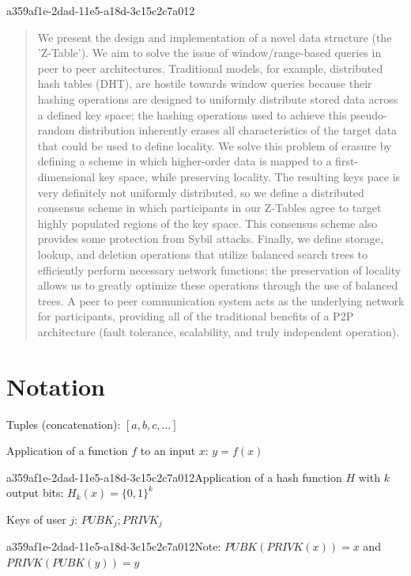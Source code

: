 \documentclass[12pt]{article}
\begin{document}
\maketitle

a359af1e-2dad-11e5-a18d-3c15c2c7a012\begin{abstract}
We present the design and implementation of a novel data structure (the 'Z-Table'). We aim to solve the issue of window/range-based queries in peer to peer architectures. Traditional models, for example,  distributed hash tables (DHT), are hostile towards window queries because their hashing operations are designed to uniformly distribute stored data across a defined key space; the hashing operations used to achieve this pseudo-random distribution inherently erases all characteristics of the target data that could be used to define locality. We solve this problem of erasure by defining a scheme in which higher-order data is mapped to a first-dimensional key space, while preserving locality. The resulting keys pace is very definitely not uniformly distributed, so we define a distributed consensus scheme in which participants in our Z-Tables agree to target highly populated regions of the key space. This consensus scheme also provides some protection from Sybil attacks. Finally, we define storage, lookup, and deletion operations that utilize balanced search trees to efficiently perform necessary network functions; the preservation of locality allows us to greatly optimize these operations through the use of balanced trees. A peer to peer communication system acts as the underlying network for participants, providing all of the traditional benefits of a P2P architecture (fault tolerance, scalability, and truly independent operation).
\end{abstract}

\section{Notation}

Tuples (concatenation): $[a,b,c,...]$

Application of a function $f$ to an input $x$: $y=f(x)$

a359af1e-2dad-11e5-a18d-3c15c2c7a012Application of a hash function $H$ with $k$ output bits: $H_{k}(x) = \{0,1\}^k$

Keys of user $j$: $ PUBK_j; PRIVK_j $

a359af1e-2dad-11e5-a18d-3c15c2c7a012Note: $PUBK(PRIVK(x)) = x$ and $PRIVK(PUBK(y)) = y$~
\end{document}
